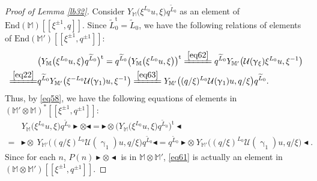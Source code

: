 \documentclass[11pt,b5paper,notitlepage]{article}
\theoremstyle{definition}
\theoremstyle{plain}
\newcommand{\mc}{\mathcal}
\newcommand{\wtd}{\widetilde}
\newcommand{\tr}{\mathrm{t}} %
\newcommand{\End}{\mathrm{End}} %
\newcommand{\Mbb}{\mathbb M}
\newcommand{\btl}{\blacktriangleleft}
\newcommand{\btr}{\blacktriangleright}
\numberwithin{equation}{section}
\begin{document}
\begin{proof}[Proof of Lemma \ref{lb32}]
	Consider $Y_{\Mbb}\big(\xi^{L_0}u,\xi\big)q^{\wtd L_0}$ as an element of $\End(\Mbb)[[\xi^{\pm1},q]]$. Since $\wtd L_0^\tr=\wtd L_0$,  we have the following relations of elements of $\End(\Mbb')[[\xi^{\pm1},q^{\pm 1}]]$:
	\begin{align*}
	&\big(Y_{\Mbb}\big(\xi^{L_0}u,\xi\big)q^{\wtd L_0}\big)^\tr=q^{\wtd L_0}\big(Y_{\Mbb}\big(\xi^{L_0}u,\xi\big)\big)^\tr\xlongequal{\eqref{eq62}}q^{\wtd L_0}Y_{\Mbb'}\big(\mc U(\upgamma_\xi)\xi^{L_0}u,\xi^{-1}\big)\\
	\xlongequal{\eqref{eq22}}&q^{\wtd L_0}Y_{\Mbb'}\big(\xi^{-L_0}\mc U(\upgamma_1)u,\xi^{-1}\big)\xlongequal{\eqref{eq63}}Y_{\Mbb'}\big((q/\xi)^{L_0}\mc U(\upgamma_1)u,q/\xi\big)q^{\wtd L_0}.
	\end{align*}
Thus, by \eqref{eq58}, we have the following equations of elements in $(\Mbb'\otimes\Mbb)^*[[\xi^{\pm1},q^{\pm 1}]]$:
	\begin{align}
	&Y_{\Mbb}\big(\xi^{L_0}u,\xi\big)q^{\wtd L_0}\btr\otimes\btl=\btr\otimes \big(Y_{\Mbb}\big(\xi^{L_0}u,\xi\big)q^{\wtd L_0}\big)^\tr\btl\nonumber\\
	=&\btr\otimes~Y_{\Mbb'}\big((q/\xi)^{L_0}\mc U(\upgamma_1)u,q/\xi\big)q^{\wtd L_0}\btl=q^{\wtd L_0}\btr\otimes~Y_{\Mbb'}\big((q/\xi)^{L_0}\mc U(\upgamma_1)u,q/\xi\big)\btl.\label{eq61}
	\end{align}
	Since for each $n$, $P(n)\btr\otimes\btl$ is in $\Mbb\otimes\Mbb'$, \eqref{eq61} is actually an element in $(\Mbb\otimes\Mbb')[[\xi^{\pm1},q^{\pm 1}]]$.
	

\end{proof}
\end{document}
